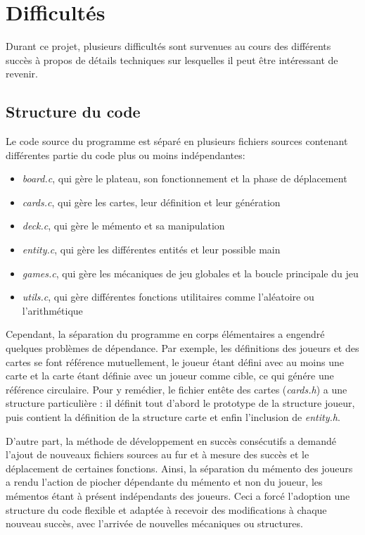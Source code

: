 \documentclass[12pt]{article}
\begin{document}
\section{Difficultés}
Durant ce projet, plusieurs difficultés sont survenues au cours des différents succès à propos de détails techniques sur lesquelles il peut être intéressant de revenir.

\subsection{Structure du code}
Le code source du programme est séparé en plusieurs fichiers sources contenant différentes partie du code plus ou moins indépendantes:
\begin{itemize}
\item \textit{board.c}, qui gère le plateau, son fonctionnement et la phase de déplacement
\item \textit{cards.c}, qui gère les cartes, leur définition et leur génération
\item \textit{deck.c}, qui gère le mémento et sa manipulation
\item \textit{entity.c}, qui gère les différentes entités et leur possible main
\item \textit{games.c}, qui gère les mécaniques de jeu globales et la boucle principale du jeu
\item \textit{utils.c}, qui gère différentes fonctions utilitaires comme l'aléatoire ou l'arithmétique
\end{itemize}

Cependant, la séparation du programme en corps élémentaires a engendré quelques problèmes de dépendance.
Par exemple, les définitions des joueurs et des cartes se font référence mutuellement, le joueur étant défini avec au moins une carte et la carte étant définie avec un joueur comme cible, ce qui génére une référence circulaire.
Pour y remédier, le fichier entête des cartes (\textit{cards.h}) a une structure particulière : il définit tout d'abord le prototype de la structure joueur, puis contient la définition de la structure carte et enfin l'inclusion de \textit{entity.h}.

D'autre part, la méthode de développement en succès consécutifs a demandé l'ajout de nouveaux fichiers sources au fur et à mesure des succès et le déplacement de certaines fonctions.
Ainsi, la séparation du mémento des joueurs a rendu l'action de piocher dépendante du mémento et non du joueur, les mémentos étant à présent indépendants des joueurs.
Ceci a forcé l'adoption une structure du code flexible et adaptée à recevoir des modifications à chaque nouveau succès, avec l'arrivée de nouvelles mécaniques ou structures.
\end{document}

